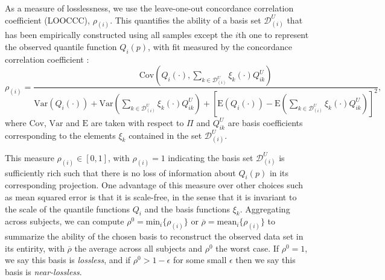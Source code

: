 \documentclass[11pt]{article}
\begin{document}
As a measure of losslessness, we use the leave-one-out concordance correlation coefficient (LOOCCC), $\rho_{(i)}$.   This quantifies the ability of a basis set $\mathcal{D}^U_{(i)}$ that has been empirically constructed using all samples except the $i$th one to represent the observed quantile function $Q_i(p)$, with fit measured by the concordance correlation coefficient \cite{lawrence1989concordance}:
 \begin{equation}  \label{p5_rhoi}  
\rho_{(i)}=\frac{ \text{Cov}( Q_i(\cdot), \sum_{k \in   \mathcal{D}^U_{(i)} }  \xi_k(\cdot)  Q_{ik}^{U} ) }
{ \text{Var}( Q_i(\cdot) )  + \text{Var}( \sum_{k \in   \mathcal{D}^U_{(i)} }  \xi_k(\cdot)  Q_{ik}^{U})
+  [ \text{E}(Q_i(\cdot))-  \text{E}(\sum_{k \in   \mathcal{D}^U_{(i)} }  \xi_k(\cdot)  Q_{ik}^{U})]^2    }, 
\end{equation} 
where 
$\text{Cov}$, $\text{Var}$ and $\text{E}$ are taken with respect to ${\Pi}$ and
$Q_{ik}^{U}$ are basis coefficients corresponding to the elements $\xi_k$ contained in the set $\mathcal{D}^U_{(i)}$. %

This measure $\rho_{(i)} \in [0,1]$, with $\rho_{(i)}=1$ indicating the basis set $\mathcal{D}^U_{(i)}$ is sufficiently rich such that there is no loss of information about $Q_i(p)$ in its corresponding projection.  One advantage of this measure over other choices such as mean squared error is that it is scale-free, in the sense that it is invariant to the scale of the quantile functions $Q_i$ and the basis functions $\xi_k$.  Aggregating across subjects, we can compute $\rho^0=\text{min}_i\{\rho_{(i)}\}$ or $\overline{\rho}=\text{mean}_i\{\rho_{(i)}\}$ to summarize the ability of the chosen basis to reconstruct the observed data set in its entirity, with $\overline{\rho}$ the average across all subjects and $\rho^0$ the worst case.  If $\rho^0=1$, we say this basis is \textit{lossless}, and if $\rho^0>1-\epsilon$ for some small $\epsilon$ then we say this basis is \textit{near-lossless}.
\end{document}
